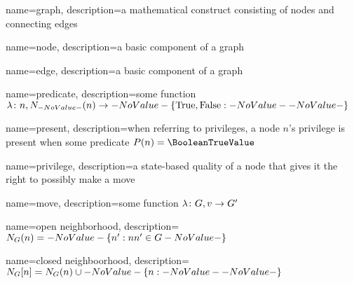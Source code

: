 
{
  name=graph,
  description={a mathematical construct consisting of nodes and connecting edges}
}

{
  name=node,
  description={a basic component of a graph}
}

{
  name=edge,
  description={a basic component of a graph}
}

{
  name=predicate,
  description={some function $\Function{n, \OpenNeighborhood{n}}{\SetBoolean}$}
}

{
  name=present,
  description={when referring to privileges, a node $n$'s privilege is present when some predicate $P(n) = \BooleanTrueValue$}
}

{
  name=privilege,
  description={a state-based quality of a node that gives it the right to possibly make a move}
}

{
  name=move,
  description={some function $\Function{G, v}{G^\prime}$}
}




{
  name=open neighborhood,
  description={$\OpenNeighborhood{n}[G] = \Set{n^\prime}[nn^\prime \in G]$}
}

{
  name=closed neighboorhood,
  description={$\ClosedNeighborhood{n}[G] = \OpenNeighborhood{n}[G] \cup \Set{n}$}
}

